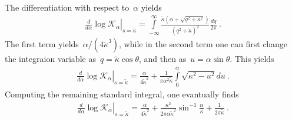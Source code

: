 \documentclass[preprint,aps,eqsecnum, prb]{revtex4-1}
\begin{document}
The differentiation with respect to~$\alpha$ yields
\begin{align}
  \left.\frac{d}{d\alpha}\log \mathcal{K}_{\alpha}
  \right|_{s = {\tilde\kappa}}
  = \int\limits_{-\infty}^{\infty}
  \frac{{\tilde\kappa} (\alpha + \sqrt{q^2 + \kappa^2})}{
  \left(q^2 + {\tilde \kappa}\right)^2} \frac{dq}{2\pi}
  \ .
\end{align}
The first term yields~$\alpha /(4{\tilde\kappa}^3)$, while in
the second term one can first change the integraion variable
as~$q = {\tilde\kappa}\cos\theta$, and then as~$u = \alpha \sin\theta$.
This yields
\begin{align}
  \left.\frac{d}{d\alpha}\log \mathcal{K}_{\alpha}
  \right|_{s = {\tilde\kappa}}
  = \frac{\alpha}{4{\tilde\kappa}^2} + \frac{1}{\pi\alpha^2 {\tilde\kappa}}
  \int\limits_{0}^{\alpha} \sqrt{\kappa^2 - u^2} du\ .
\end{align}
Computing the remaining standard integral, one evantually finds
\begin{align}
  \label{eq:appA-1st-half}
  \left.\frac{d}{d\alpha}\log \mathcal{K}_{\alpha}
  \right|_{s = {\tilde\kappa}}
  = \frac{\alpha}{4{\tilde\kappa}^2}
  + \frac{\kappa^2}{2\pi\alpha{\tilde\kappa}^2} \sin^{-1}\frac{\alpha}{\kappa}
  + \frac{1}{2\pi{\tilde\kappa}}\ .
\end{align}
\end{document}
